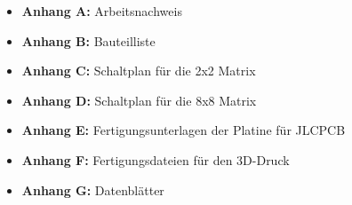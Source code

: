 \begin{itemize}
    \item \textbf{Anhang A:} Arbeitsnachweis
    \item \textbf{Anhang B:} Bauteilliste
    \item \textbf{Anhang C:} Schaltplan für die 2x2 Matrix
    \item \textbf{Anhang D:} Schaltplan für die 8x8 Matrix
    \item \textbf{Anhang E:} Fertigungsunterlagen der Platine für JLCPCB
    \item \textbf{Anhang F:} Fertigungsdateien für den 3D-Druck
    \item \textbf{Anhang G:} Datenblätter
\end{itemize}
